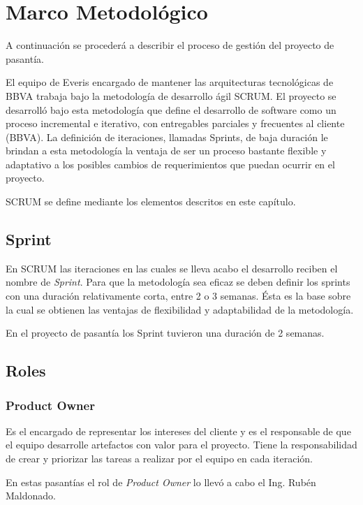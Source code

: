 \chapter{Marco Metodológico}
\label{capitulo4}

A continuación se procederá a describir el proceso de gestión
del proyecto de pasantía.

El equipo de Everis encargado de mantener las arquitecturas tecnológicas
de BBVA trabaja bajo la metodología de desarrollo ágil SCRUM.
El proyecto se desarrolló bajo
esta metodología que define el desarrollo de software como un proceso
incremental e iterativo, con entregables parciales y frecuentes al
cliente (BBVA). La definición de iteraciones, llamadas Sprints, de baja duración
le brindan a esta metodología la ventaja de ser un proceso bastante flexible y
adaptativo a los posibles cambios de requerimientos que puedan ocurrir en el proyecto.

SCRUM se define mediante los elementos descritos en este capítulo.

\section{Sprint}
En SCRUM las iteraciones en las cuales se lleva acabo el desarrollo reciben el nombre
de \emph{Sprint}. Para que la metodología sea eficaz se deben definir los sprints con
una duración relativamente corta, entre 2 o 3 semanas. Ésta es la base sobre la cual
se obtienen las ventajas de flexibilidad y adaptabilidad de la metodología.

En el proyecto de pasantía los Sprint tuvieron una duración de 2 semanas.

\section{Roles}

\subsection{Product Owner}
Es el encargado de representar los intereses del cliente y es el responsable de
que el equipo desarrolle artefactos con valor para el proyecto. Tiene la responsabilidad
de crear y priorizar las tareas a realizar por el equipo en cada iteración.

En estas pasantías el rol de \emph{Product Owner} lo llevó a cabo el Ing. Rubén
Maldonado.

